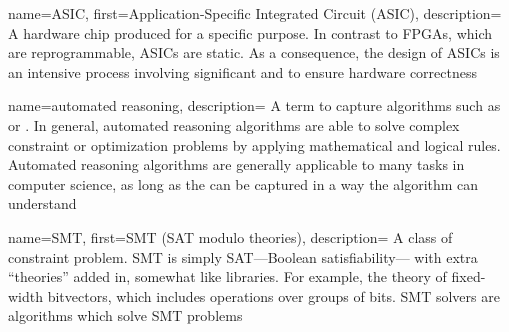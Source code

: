 {
    name={ASIC},
    first={Application-Specific Integrated Circuit (ASIC)},
    description={
A hardware chip produced for a specific purpose.
In contrast to FPGAs, which are reprogrammable,
  ASICs are static.
As a consequence, the design of ASICs is an intensive process
  involving significant  and 
  to ensure hardware correctness}
}

{
    name={automated reasoning},
    description={
A term to capture algorithms such as  or .
In general, automated reasoning algorithms
  are able to solve
  complex constraint or optimization problems
  by applying mathematical and logical rules.
Automated reasoning algorithms
  are generally applicable to many tasks in computer science,
  as long as the can be captured
  in a way the algorithm can understand}
}


{
    name={SMT},
    first={SMT (SAT modulo theories)},
    description={
A class of constraint problem.
SMT is simply SAT---Boolean satisfiability---%
  with extra ``theories'' added in,
  somewhat like libraries.
For example, the theory of fixed-width bitvectors,
  which includes operations over groups of bits.
SMT solvers are  algorithms
  which solve SMT problems}
}